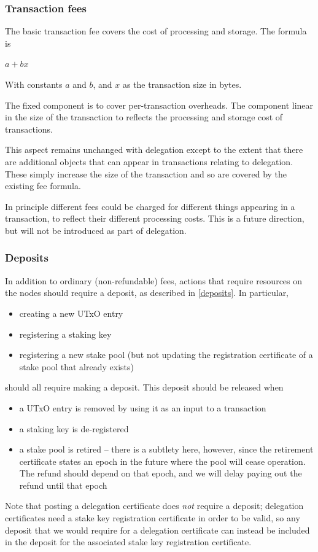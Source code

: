 \documentclass[11pt,a4paper]{article}
\begin{document}
\subsubsection{Transaction fees}
\label{transaction-fees}

The basic transaction fee covers the cost of processing and storage. The
formula is

\(a + b x\)

With constants \(a\) and \(b\), and \(x\) as the transaction size in
bytes.

The fixed component is to cover per-transaction overheads. The component
linear in the size of the transaction to reflects the processing and
storage cost of transactions.

This aspect remains unchanged with delegation except to the extent that
there are additional objects that can appear in transactions relating to
delegation. These simply increase the size of the transaction and so are
covered by the existing fee formula.

In principle different fees could be charged for different things
appearing in a transaction, to reflect their different processing costs.
This is a future direction, but will not be introduced as part of
delegation.

\subsubsection{Deposits}
\label{fees-deposits}

In addition to ordinary (non-refundable) fees, actions that require
resources on the nodes should require a deposit, as described in
\cref{deposits}. In particular,
\begin{itemize}
\item creating a new UTxO entry
\item registering a staking key
\item registering a new stake pool (but not updating the registration
  certificate of a stake pool that already exists)
\end{itemize}
should all require making a deposit. This deposit should be released
when
\begin{itemize}
\item a UTxO entry is removed by using it as an input to a transaction
\item a staking key is de-registered
\item a stake pool is retired -- there is a subtlety here, however,
  since the retirement certificate states an epoch in the future where
  the pool will cease operation. The refund should depend on that
  epoch, and we will delay paying out the refund until that epoch
\end{itemize}
Note that posting a delegation certificate does \emph{not} require a
deposit; delegation certificates need a stake key registration
certificate in order to be valid, so any deposit that we would require
for a delegation certificate can instead be included in the deposit
for the associated stake key registration certificate.
\end{document}
